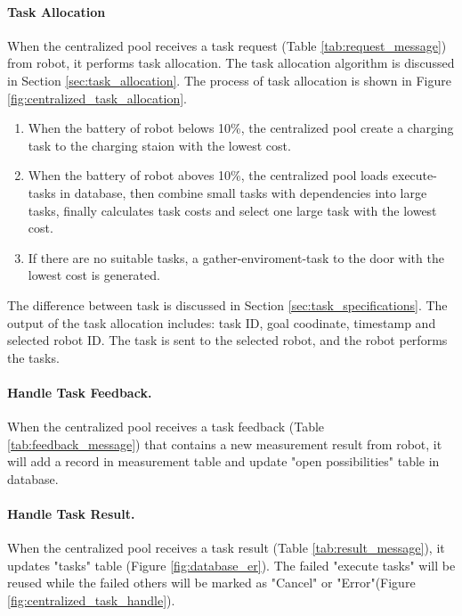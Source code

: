 \paragraph{Task Allocation}
When the centralized pool receives a task request (Table \ref{tab:request_message}) from robot, it performs task allocation. The task allocation algorithm is discussed in Section \ref{sec:task_allocation}. The process of task allocation is shown in Figure \ref{fig:centralized_task_allocation}. 
\begin{enumerate}
	\item When the battery of robot belows 10\%, the centralized pool create a charging task to the charging staion with the lowest cost.
	\item When the battery of robot aboves 10\%, the centralized pool loads execute-tasks in database, then combine small tasks with dependencies into large tasks, finally calculates task costs and select one large task with the lowest cost. 
	\item If there are no suitable tasks, a gather-enviroment-task to the door with the lowest cost is generated. 
\end{enumerate}
The difference between task is discussed in Section \ref{sec:task_specifications}. The output of the task allocation includes: task ID, goal coodinate, timestamp and selected robot ID. The task is sent to the selected robot, and the robot performs the tasks.

\paragraph{Handle Task Feedback.}
When the centralized pool receives a task feedback (Table \ref{tab:feedback_message}) that contains a new measurement result from robot, it will add a record in measurement table and update "open possibilities" table in database.

\paragraph{Handle Task Result.}
When the centralized pool receives a task result (Table \ref{tab:result_message}), it updates "tasks" table (Figure \ref{fig:database_er}). The failed "execute tasks" will be reused while the failed others will be marked as "Cancel" or "Error"(Figure \ref{fig:centralized_task_handle}).

